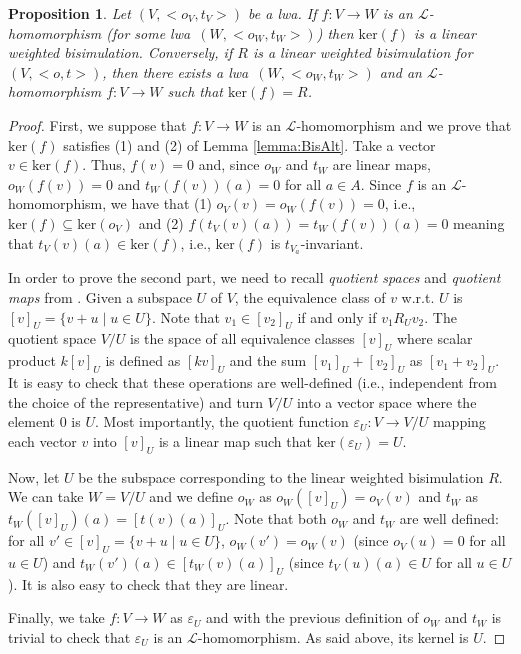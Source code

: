 \documentclass[3p]{elsarticle}
\newcommand{\fL}{\mathcal{L}}    %
\newcommand{\kernel}{\mathrm{ker}} %
\newcommand{\lwa}{{\sc lwa}}           %
\newtheorem{proposition}{Proposition}
\begin{document}
\begin{proposition}\label{prop:MorphismBis}
Let $(V,<o_V,t_V>)$ be a \lwa. If $f\colon V\to W$ is an
$\fL$-homomorphism (for some \lwa\ $(W,<o_W,t_W>)$) then
$\kernel(f)$ is a linear weighted bisimulation. Conversely, if $R$
is a linear weighted bisimulation for $(V,<o,t>)$, then there exists
a \lwa\ $(W,<o_W,t_W>)$ and an $\fL$-homomorphism $f\colon V \to W$
such that $\kernel(f)=R$.
\end{proposition}
\begin{proof}
First, we suppose that $f\colon V\to W$ is an $\fL$-homomorphism and
we prove that $\kernel(f)$ satisfies (1) and (2) of Lemma
\ref{lemma:BisAlt}. Take a vector $v\in \kernel(f)$. Thus, $f(v)=0$
and, since $o_W$ and $t_W$ are linear maps, $o_W(f(v))=0$ and
$t_W(f(v))(a)=0$ for all $a \in A$. Since $f$ is an
$\fL$-homomorphism, we have that (1) $o_V(v)=o_W(f(v))=0$, i.e.,
$\kernel(f)\subseteq \kernel(o_V)$ and (2)
$f(t_V(v)(a))=t_W(f(v))(a)=0$ meaning that $t_V(v)(a)\in
\kernel(f)$, i.e., $\kernel(f)$ is $t_{V_a}$-invariant.

In order to prove the second part, we need to recall \emph{quotient
spaces} and \emph{quotient maps} from \cite{Halmos}. Given a
subspace $U$ of $V$, the equivalence class of $v$ w.r.t. $U$ is
$[v]_U =\{v+u \;|\; u \in U\}$. Note that $v_1\in[v_2]_U$ if and
only if $v_1R_Uv_2$. The quotient space $V/U$ is the space of all
equivalence classes $[v]_U$ where scalar product $k [v]_U$ is
defined as $[k v]_U$ and the sum $[v_1]_U + [v_2]_U$ as
$[v_1+v_2]_U$. It is easy to check that these operations are
well-defined (i.e., independent from the choice of the
representative) and turn $V/U$ into a vector space where the element
$0$ is $U$. Most importantly, the quotient function
$\varepsilon_U\colon V \to V/U$ mapping each vector $v$ into $[v]_U$
is a linear map such that $\kernel(\varepsilon_U)=U$.

Now, let $U$ be the subspace corresponding to the linear weighted
bisimulation $R$. We can take $W=V/U$ and we define $o_W$ as
$o_W([v]_U)=o_V(v)$ and $t_W$ as $t_W([v]_U)(a)=[t(v)(a)]_U$. Note
that both $o_W$ and $t_W$ are well defined: for all $v'\in
[v]_U=\{v+ u \;|\; u\in U \}$, $o_W(v')=o_W(v)$ (since $o_V(u)=0$
for all $u\in U$) and $t_W(v')(a)\in [t_W(v)(a)]_U$ (since
$t_V(u)(a)\in U$ for all $u\in U$). It is also easy to check that
they are linear.

Finally, we take $f\colon V \to W$ as $\varepsilon_U$ and with the
previous definition of $o_W$ and $t_W$ is trivial to check that
$\varepsilon_U$ is an $\fL$-homomorphism. As said above, its kernel
is $U$.
\end{proof}
\end{document}
